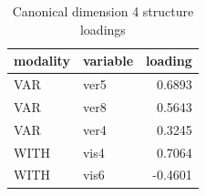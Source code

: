 \begin{table}
\caption{Canonical dimension 4 structure loadings}
\label{tab:cca_dimension_4_loadings}
\begin{tabular}{llr}
\toprule
modality & variable & loading \\
\midrule
VAR & ver5 & 0.6893 \\
VAR & ver8 & 0.5643 \\
VAR & ver4 & 0.3245 \\
WITH & vis4 & 0.7064 \\
WITH & vis6 & -0.4601 \\
\bottomrule
\end{tabular}
\end{table}
